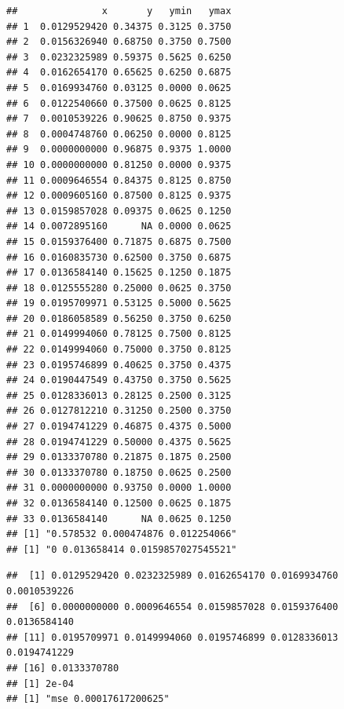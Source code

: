 \documentclass[]{article}
\begin{document}
\begin{verbatim}
##               x       y   ymin   ymax
## 1  0.0129529420 0.34375 0.3125 0.3750
## 2  0.0156326940 0.68750 0.3750 0.7500
## 3  0.0232325989 0.59375 0.5625 0.6250
## 4  0.0162654170 0.65625 0.6250 0.6875
## 5  0.0169934760 0.03125 0.0000 0.0625
## 6  0.0122540660 0.37500 0.0625 0.8125
## 7  0.0010539226 0.90625 0.8750 0.9375
## 8  0.0004748760 0.06250 0.0000 0.8125
## 9  0.0000000000 0.96875 0.9375 1.0000
## 10 0.0000000000 0.81250 0.0000 0.9375
## 11 0.0009646554 0.84375 0.8125 0.8750
## 12 0.0009605160 0.87500 0.8125 0.9375
## 13 0.0159857028 0.09375 0.0625 0.1250
## 14 0.0072895160      NA 0.0000 0.0625
## 15 0.0159376400 0.71875 0.6875 0.7500
## 16 0.0160835730 0.62500 0.3750 0.6875
## 17 0.0136584140 0.15625 0.1250 0.1875
## 18 0.0125555280 0.25000 0.0625 0.3750
## 19 0.0195709971 0.53125 0.5000 0.5625
## 20 0.0186058589 0.56250 0.3750 0.6250
## 21 0.0149994060 0.78125 0.7500 0.8125
## 22 0.0149994060 0.75000 0.3750 0.8125
## 23 0.0195746899 0.40625 0.3750 0.4375
## 24 0.0190447549 0.43750 0.3750 0.5625
## 25 0.0128336013 0.28125 0.2500 0.3125
## 26 0.0127812210 0.31250 0.2500 0.3750
## 27 0.0194741229 0.46875 0.4375 0.5000
## 28 0.0194741229 0.50000 0.4375 0.5625
## 29 0.0133370780 0.21875 0.1875 0.2500
## 30 0.0133370780 0.18750 0.0625 0.2500
## 31 0.0000000000 0.93750 0.0000 1.0000
## 32 0.0136584140 0.12500 0.0625 0.1875
## 33 0.0136584140      NA 0.0625 0.1250
## [1] "0.578532 0.000474876 0.012254066"
## [1] "0 0.013658414 0.0159857027545521"
\end{verbatim}

\begin{verbatim}
##  [1] 0.0129529420 0.0232325989 0.0162654170 0.0169934760 0.0010539226
##  [6] 0.0000000000 0.0009646554 0.0159857028 0.0159376400 0.0136584140
## [11] 0.0195709971 0.0149994060 0.0195746899 0.0128336013 0.0194741229
## [16] 0.0133370780
## [1] 2e-04
## [1] "mse 0.00017617200625"
\end{verbatim}
\end{document}
